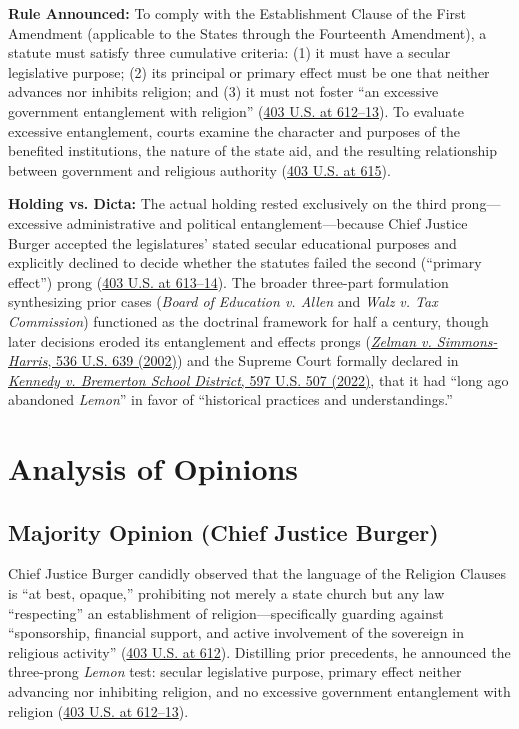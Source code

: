 \documentclass[12pt]{article}
\begin{document}
\textbf{Rule Announced:} To comply with the Establishment Clause of the First Amendment (applicable to the States through the Fourteenth Amendment), a statute must satisfy three cumulative criteria: (1) it must have a secular legislative purpose; (2) its principal or primary effect must be one that neither advances nor inhibits religion; and (3) it must not foster ``an excessive government entanglement with religion'' (\href{https://supreme.justia.com/cases/federal/us/403/602/}{403 U.S. at 612--13}). To evaluate excessive entanglement, courts examine the character and purposes of the benefited institutions, the nature of the state aid, and the resulting relationship between government and religious authority (\href{https://supreme.justia.com/cases/federal/us/403/602/}{403 U.S. at 615}).

\textbf{Holding vs. Dicta:} The actual holding rested exclusively on the third prong---excessive administrative and political entanglement---because Chief Justice Burger accepted the legislatures' stated secular educational purposes and explicitly declined to decide whether the statutes failed the second (``primary effect'') prong (\href{https://supreme.justia.com/cases/federal/us/403/602/}{403 U.S. at 613--14}). The broader three-part formulation synthesizing prior cases (\textit{Board of Education v. Allen} and \textit{Walz v. Tax Commission}) functioned as the doctrinal framework for half a century, though later decisions eroded its entanglement and effects prongs (\href{https://supreme.justia.com/cases/federal/us/536/639/}{\textit{Zelman v. Simmons-Harris}, 536 U.S. 639 (2002)}) and the Supreme Court formally declared in \href{https://supreme.justia.com/cases/federal/us/597/21-418/}{\textit{Kennedy v. Bremerton School District}, 597 U.S. 507 (2022)}, that it had ``long ago abandoned \textit{Lemon}'' in favor of ``historical practices and understandings.''

\section{Analysis of Opinions}

\subsection{Majority Opinion (Chief Justice Burger)}
Chief Justice Burger candidly observed that the language of the Religion Clauses is ``at best, opaque,'' prohibiting not merely a state church but any law ``respecting'' an establishment of religion---specifically guarding against ``sponsorship, financial support, and active involvement of the sovereign in religious activity'' (\href{https://supreme.justia.com/cases/federal/us/403/602/}{403 U.S. at 612}). Distilling prior precedents, he announced the three-prong \textit{Lemon} test: secular legislative purpose, primary effect neither advancing nor inhibiting religion, and no excessive government entanglement with religion (\href{https://supreme.justia.com/cases/federal/us/403/602/}{403 U.S. at 612--13}).
\end{document}
